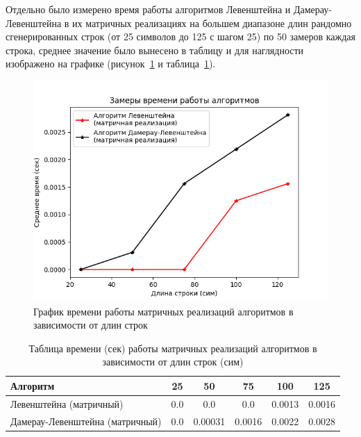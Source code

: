 \hspace{1.25cm}
Отдельно было измерено время работы алгоритмов Левенштейна и Дамерау-Левенштейна в их матричных реализациях на большем диапазоне длин рандомно сгенерированных строк (от 25 символов до 125 с шагом 25) по 50 замеров каждая строка, среднее значение было вынесено в таблицу и для наглядности изображено на графике (рисунок~\ref{fig:graph_mat} и таблица~\ref{table:table_mat}).

\begin{figure}[H]
    \centering
    \includegraphics[width=1\textwidth]{img/graph_mat.png}
    \caption{График времени работы матричных реализаций алгоритмов в зависимости от длин строк}
    \label{fig:graph_mat}
\end{figure}

\begin{table}[H]
    \centering
    \caption{Таблица времени (сек) работы матричных реализаций алгоритмов в зависимости от длин строк (сим)}
    \begin{tabular}{|l|c|c|c|c|c|}
        \hline
        \textbf{Алгоритм} & \textbf{25} & \textbf{50} & \textbf{75} & \textbf{100} & \textbf{125}\\
        \hline
        Левенштейна (матричный) & 0.0 & 0.0 & 0.0 & 0.0013 & 0.0016 \\
        Дамерау-Левенштейна (матричный) & 0.0 & 0.00031 & 0.0016  & 0.0022 & 0.0028 \\
        \hline
    \end{tabular}
    \label{table:table_mat}
\end{table}


